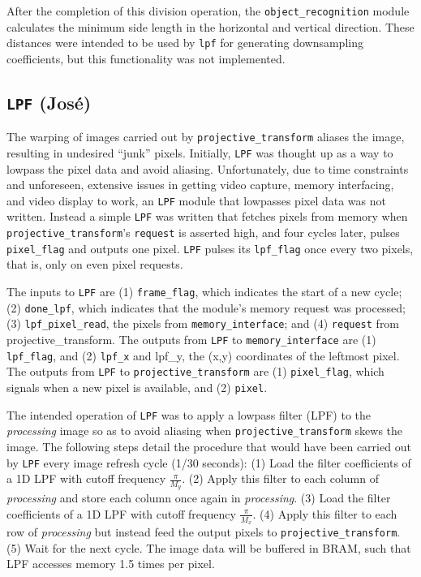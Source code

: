 \documentclass[10pt]{article}
\begin{document}
After the completion of this division operation, the {\tt object\_recognition} module calculates the minimum side length in the horizontal and vertical direction. These distances were intended to be used by {\tt lpf} for generating downsampling coefficients, but this functionality was not implemented.

\subsection{{\tt LPF} (Jos\'{e})}
The warping of images carried out by {\tt projective\_transform} aliases the image, resulting in undesired ``junk'' pixels. Initially, {\tt LPF} was thought up as a way to lowpass the pixel data and avoid aliasing. Unfortunately, due to time constraints and unforeseen, extensive issues in getting video capture, memory interfacing, and video display to work, an {\tt LPF} module that lowpasses pixel data was not written. Instead a simple {\tt LPF} was written that fetches pixels from memory when {\tt projective\_transform}'s {\tt request} is asserted high, and four cycles later, pulses {\tt pixel\_flag} and outputs one pixel. {\tt LPF} pulses its {\tt lpf\_flag} once every two pixels, that is, only on even pixel requests.

The inputs to {\tt LPF} are (1) {\tt frame\_flag}, which indicates the start of a new cycle; (2) {\tt done\_lpf}, which indicates that the module's memory request was processed; (3) {\tt lpf\_pixel\_read}, the pixels from {\tt memory\_interface}; and (4) {\tt request} from {projective\_transform}. The outputs from {\tt LPF} to {\tt memory\_interface} are (1) {\tt lpf\_flag}, and (2) {\tt lpf\_x} and {lpf\_y}, the (x,y) coordinates of the leftmost pixel. The outputs from {\tt LPF} to {\tt projective\_transform} are (1) {\tt pixel\_flag}, which signals when a new pixel is available, and (2) {\tt pixel}.

The intended operation of {\tt LPF} was to apply a lowpass filter (LPF) to the {\it processing} image so as to avoid aliasing when {\tt projective\_transform} skews the image. The following steps detail the procedure that would have been carried out by {\tt LPF} every image refresh cycle (1/30 seconds): (1) Load the filter coefficients of a 1D LPF with cutoff frequency \( \frac{\pi}{M_y} \). (2) Apply this filter to each column of {\it processing} and store each column once again in {\it processing}. (3) Load the filter coefficients of a 1D LPF with cutoff frequency \( \frac{\pi}{M_x} \). (4) Apply this filter to each row of {\it processing} but instead feed the output pixels to {\tt projective\_transform}. (5) Wait for the next cycle. The image data will be buffered in BRAM, such that LPF accesses memory 1.5 times per pixel.
\end{document}
